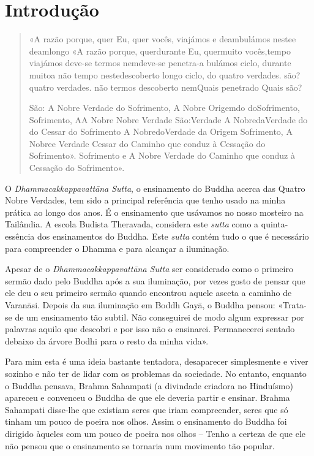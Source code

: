 \chapter{Introdução}

\begin{quote}
  «A razão porque, quer Eu, quer vocês, viajámos e deambulámos nestee deamlongo
  «A razão porque, querdurante Eu, quermuito vocês,tempo viajámos deve-se termos
  nemdeve-se penetra-a bulámos ciclo, durante muitoa não tempo nestedescoberto
  longo ciclo, do quatro verdades. são? quatro verdades. não termos descoberto
  nemQuais penetrado Quais são?

  São: A Nobre Verdade do Sofrimento, A Nobre Origemdo doSofrimento, Sofrimento,
  AA Nobre Nobre Verdade São:Verdade A NobredaVerdade do do Cessar do Sofrimento
  A NobredoVerdade da Origem Sofrimento, A Nobree Verdade Cessar do Caminho que
  conduz à Cessação do Sofrimento». Sofrimento e A Nobre Verdade do Caminho que
  conduz à Cessação do Sofrimento».

\end{quote}

O \emph{Dhammacakkappavattāna Sutta}, o ensinamento do Buddha acerca das Quatro
Nobre Verdades, tem sido a principal referência que tenho usado na minha prática
ao longo dos anos. É o ensinamento que usávamos no nosso mosteiro na Tailândia.
A escola Budista Theravada, considera este \emph{sutta} como a quinta-essência
dos ensinamentos do Buddha. Este \emph{sutta} contém tudo o que é necessário
para compreender o Dhamma e para alcançar a iluminação.

Apesar de o \emph{Dhammacakkappavattāna Sutta} ser considerado como o primeiro
sermão dado pelo Buddha após a sua iluminação, por vezes gosto de pensar que ele
deu o seu primeiro sermão quando encontrou aquele asceta a caminho de Varanāsi.
Depois da sua iluminação em Boddh Gayā, o Buddha pensou: «Trata-se de um
ensinamento tão subtil. Não conseguirei de modo algum expressar por palavras
aquilo que descobri e por isso não o ensinarei. Permanecerei sentado debaixo da
árvore Bodhi para o resto da minha vida».

Para mim esta é uma ideia bastante tentadora, desaparecer simplesmente e viver
sozinho e não ter de lidar com os problemas da sociedade. No entanto, enquanto o
Buddha pensava, Brahma Sahampati (a divindade criadora no Hinduísmo) apareceu e
convenceu o Buddha de que ele deveria partir e ensinar. Brahma Sahampati
disse-lhe que existiam seres que iriam compreender, seres que só tinham um pouco
de poeira nos olhos. Assim o ensinamento do Buddha foi dirigido àqueles com um
pouco de poeira nos olhos – Tenho a certeza de que ele não pensou que o
ensinamento se tornaria num movimento tão popular.

